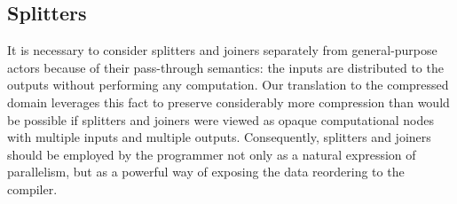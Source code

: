 




\subsection{Splitters}

It is necessary to consider splitters and joiners separately from
general-purpose actors because of their pass-through semantics: the
inputs are distributed to the outputs without performing any
computation.  Our translation to the compressed domain leverages this
fact to preserve considerably more compression than would be possible
if splitters and joiners were viewed as opaque computational nodes
with multiple inputs and multiple outputs.  Consequently, splitters
and joiners should be employed by the programmer not only as a natural
expression of parallelism, but as a powerful way of exposing the data
reordering to the compiler.

